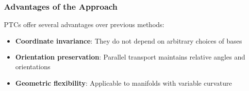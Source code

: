 \subsubsection{Advantages of the Approach}

PTCs offer several advantages over previous methods:

\begin{itemize}
    \item \textbf{Coordinate invariance}: They do not depend on arbitrary choices of bases
    \item \textbf{Orientation preservation}: Parallel transport maintains relative angles and orientations
    \item \textbf{Geometric flexibility}: Applicable to manifolds with variable curvature
\end{itemize}

